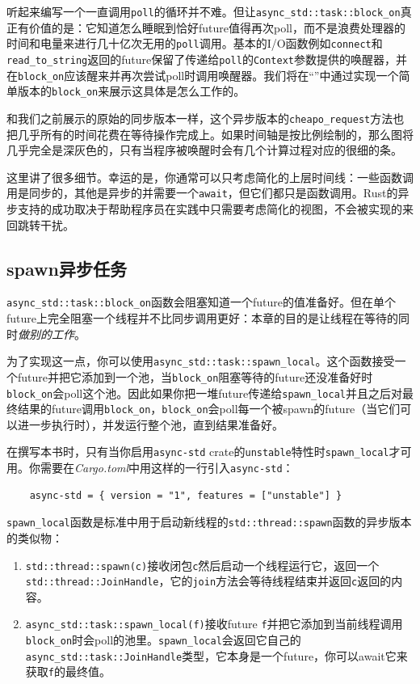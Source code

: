 听起来编写一个一直调用\texttt{poll}的循环并不难。但让\texttt{async\_std::task::block\_on}真正有价值的是：它知道怎么睡眠到恰好future值得再次poll，而不是浪费处理器的时间和电量来进行几十亿次无用的\texttt{poll}调用。基本的I/O函数例如\texttt{connect}和\texttt{read\_to\_string}返回的future保留了传递给\texttt{poll}的\texttt{Context}参数提供的唤醒器，并在\texttt{block\_on}应该醒来并再次尝试poll时调用唤醒器。我们将在“”中通过实现一个简单版本的\texttt{block\_on}来展示这具体是怎么工作的。

和我们之前展示的原始的同步版本一样，这个异步版本的\texttt{cheapo\_request}方法也把几乎所有的时间花费在等待操作完成上。如果时间轴是按比例绘制的，那么图将几乎完全是深灰色的，只有当程序被唤醒时会有几个计算过程对应的很细的条。

这里讲了很多细节。幸运的是，你通常可以只考虑简化的上层时间线：一些函数调用是同步的，其他是异步的并需要一个\texttt{await}，但它们都只是函数调用。Rust的异步支持的成功取决于帮助程序员在实践中只需要考虑简化的视图，不会被实现的来回跳转干扰。

\subsection{spawn异步任务}
\texttt{async\_std::task::block\_on}函数会阻塞知道一个future的值准备好。但在单个future上完全阻塞一个线程并不比同步调用更好：本章的目的是让线程在等待的同时\emph{做别的工作}。

为了实现这一点，你可以使用\texttt{async\_std::task::spawn\_local}。这个函数接受一个future并把它添加到一个池，当\texttt{block\_on}阻塞等待的future还没准备好时\texttt{block\_on}会poll这个池。因此如果你把一堆future传递给\texttt{spawn\_local}并且之后对最终结果的future调用\texttt{block\_on}，\texttt{block\_on}会poll每一个被spawn的future（当它们可以进一步执行时），并发运行整个池，直到结果准备好。

在撰写本书时，只有当你启用\texttt{async-std} crate的\texttt{unstable}特性时\texttt{spawn\_local}才可用。你需要在\emph{Cargo.toml}中用这样的一行引入\texttt{async-std}：
\begin{verbatim}
    async-std = { version = "1", features = ["unstable"] }
\end{verbatim}

\texttt{spawn\_local}函数是标准中用于启动新线程的\texttt{std::thread::spawn}函数的异步版本的类似物：
\begin{enumerate}
    \item \texttt{std::thread::spawn(c)}接收闭包\texttt{c}然后启动一个线程运行它，返回一个\texttt{std::thread::JoinHandle}，它的\texttt{join}方法会等待线程结束并返回\texttt{c}返回的内容。
    \item \texttt{async\_std::task::spawn\_local(f)}接收future \texttt{f}并把它添加到当前线程调用\texttt{block\_on}时会poll的池里。\texttt{spawn\_local}会返回它自己的\texttt{async\_std::task::JoinHandle}类型，它本身是一个future，你可以await它来获取\texttt{f}的最终值。
\end{enumerate}

